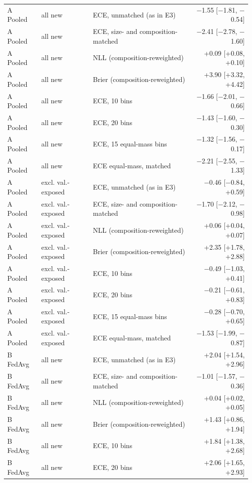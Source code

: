 \documentclass[10pt]{article}
\begin{document}
\begin{table}[!htbp]
\begin{tabular}{@{}lllr@{}}
\midrule
A Pooled & all new & ECE, unmatched (as in E3) & $-$1.55 [$-$1.81, $-$0.54] \\
A Pooled & all new & ECE, size- and composition-matched & $-$2.41 [$-$2.78, $-$1.60] \\
A Pooled & all new & NLL (composition-reweighted) & +0.09 [+0.08, +0.10] \\
A Pooled & all new & Brier (composition-reweighted) & +3.90 [+3.32, +4.42] \\
A Pooled & all new & ECE, 10 bins & $-$1.66 [$-$2.01, $-$0.66] \\
A Pooled & all new & ECE, 20 bins & $-$1.43 [$-$1.60, $-$0.30] \\
A Pooled & all new & ECE, 15 equal-mass bins & $-$1.32 [$-$1.56, $-$0.17] \\
A Pooled & all new & ECE equal-mass, matched & $-$2.21 [$-$2.55, $-$1.33] \\
A Pooled & excl. val.-exposed & ECE, unmatched (as in E3) & $-$0.46 [$-$0.84, +0.59] \\
A Pooled & excl. val.-exposed & ECE, size- and composition-matched & $-$1.70 [$-$2.12, $-$0.98] \\
A Pooled & excl. val.-exposed & NLL (composition-reweighted) & +0.06 [+0.04, +0.07] \\
A Pooled & excl. val.-exposed & Brier (composition-reweighted) & +2.35 [+1.78, +2.88] \\
A Pooled & excl. val.-exposed & ECE, 10 bins & $-$0.49 [$-$1.03, +0.41] \\
A Pooled & excl. val.-exposed & ECE, 20 bins & $-$0.21 [$-$0.61, +0.83] \\
A Pooled & excl. val.-exposed & ECE, 15 equal-mass bins & $-$0.28 [$-$0.70, +0.65] \\
A Pooled & excl. val.-exposed & ECE equal-mass, matched & $-$1.53 [$-$1.99, $-$0.87] \\
\midrule
B FedAvg & all new & ECE, unmatched (as in E3) & +2.04 [+1.54, +2.96] \\
B FedAvg & all new & ECE, size- and composition-matched & $-$1.01 [$-$1.57, $-$0.36] \\
B FedAvg & all new & NLL (composition-reweighted) & +0.04 [+0.02, +0.05] \\
B FedAvg & all new & Brier (composition-reweighted) & +1.43 [+0.86, +1.94] \\
B FedAvg & all new & ECE, 10 bins & +1.84 [+1.38, +2.68] \\
B FedAvg & all new & ECE, 20 bins & +2.06 [+1.65, +2.93] \\

\end{tabular}
\end{table}
\end{document}
